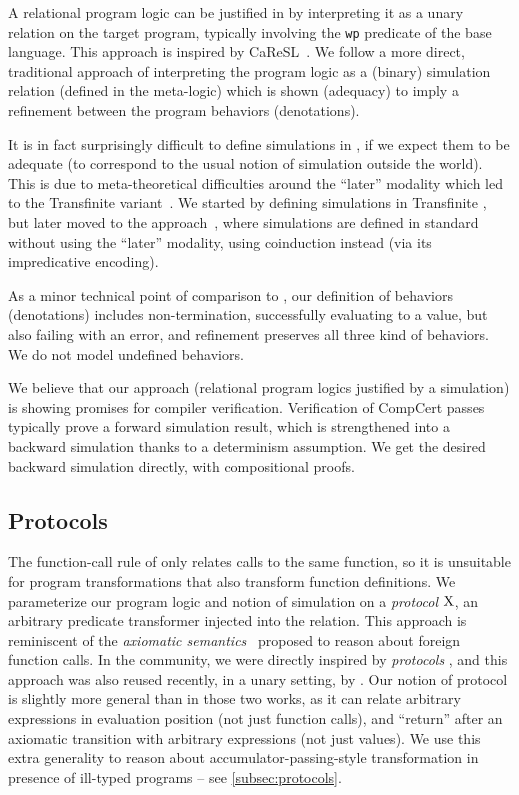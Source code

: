 A relational program logic can be justified in \Iris by interpreting it as a unary relation on the target program, typically involving the \texttt{wp} predicate of the base language. This approach is inspired by CaReSL~\citep*{caresl-2013}. We follow a more direct, traditional approach of interpreting the program logic as a (binary) simulation relation (defined in the \Iris meta-logic) which is shown (adequacy) to imply a refinement between the program behaviors (denotations).

It is in fact surprisingly difficult to define simulations in \Iris, if we expect them to be adequate (to correspond to the usual notion of simulation outside the \Iris world). This is due to meta-theoretical difficulties around the ``later'' modality which led to the Transfinite \Iris variant~\citep*{transfinite-iris-2021}. We started by defining simulations in Transfinite \Iris, but later moved to the \Simuliris approach~\citep*{simuliris-2022}, where simulations are defined in standard \Iris without using the ``later'' modality, using coinduction instead (via its impredicative encoding).

As a minor technical point of comparison to \Simuliris, our definition of behaviors (denotations) includes non-termination, successfully evaluating to a value, but also failing with an error, and refinement preserves all three kind of behaviors. We do not model undefined behaviors.

We believe that our approach (relational program logics justified by a simulation) is showing promises for compiler verification. Verification of CompCert passes typically prove a forward simulation result, which is strengthened into a backward simulation thanks to a determinism assumption. We get the desired backward simulation directly, with compositional proofs.

\subsection{Protocols}

The function-call rule of \Simuliris only relates calls to the same function, so it is unsuitable for program transformations that also transform function definitions. We parameterize our program logic and notion of simulation on a \emph{protocol} $\mathrm{X}$, an arbitrary predicate transformer injected into the relation. This approach is reminiscent of the \emph{axiomatic semantics}~\citep*{axiomatic-semantics-2014} proposed to reason about foreign function calls. In the \Iris community, we were directly inspired by \emph{protocols} \citet*{protocols-2021}, and this approach was also reused recently, in a unary setting, by \citet*{melocoton-2023}. Our notion of protocol is slightly more general than in those two works, as it can relate arbitrary expressions in evaluation position (not just function calls), and ``return'' after an axiomatic transition with arbitrary expressions (not just values). We use this extra generality to reason about accumulator-passing-style transformation in presence of ill-typed programs -- see \cref{subsec:protocols}.


